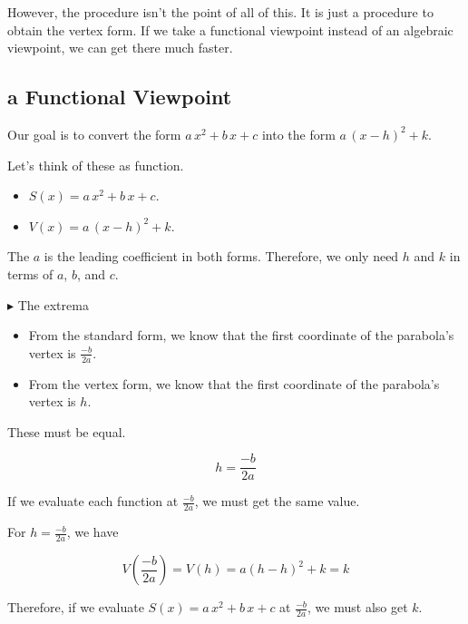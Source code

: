 \documentclass{ximera}
\begin{document}
However, the procedure isn't the point of all of this.  It is just a procedure to obtain the vertex form.  If we take a functional viewpoint instead of an algebraic viewpoint, we can get there much faster.






\subsection*{a Functional Viewpoint}



Our goal is to convert the form $a \, x^2 + b \, x + c$ into the form $a \, (x - h)^2 + k$. 

Let's think of these as function.


\begin{itemize}
\item $S(x) = a \, x^2 + b \, x + c$.
\item $V(x) = a \, (x - h)^2 + k$.
\end{itemize}



The $a$ is the leading coefficient in both forms.  Therefore, we only need $h$ and $k$ in terms of $a$, $b$, and $c$. 




\textbf{\textcolor{blue!55!black}{$\blacktriangleright$}}  The extrema 



\begin{itemize}
\item From the standard form, we know that the first coordinate of the parabola's vertex is $\frac{-b}{2 a}$.
\item From the vertex form, we know that the first coordinate of the parabola's vertex is $h$.
\end{itemize}


These must be equal.

\[
h = \frac{-b}{2 a}
\]



If we evaluate each function at $\frac{-b}{2 a}$, we must get the same value.  

For $h = \frac{-b}{2 a}$, we have 

\[
V\left( \frac{-b}{2 a} \right) = V(h) = a (h - h)^2 + k = k
\]

Therefore, if we evaluate $S(x) = a \, x^2 + b \, x + c$ at $\frac{-b}{2 a}$, we must also get $k$.
\end{document}

